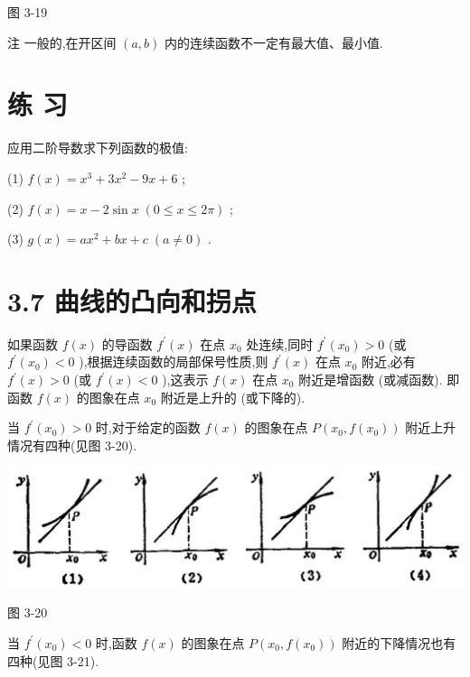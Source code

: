 \documentclass[10pt]{article}
\begin{document}
图 3-19

注 一般的,在开区间 \(\left( {a,b}\right)\) 内的连续函数不一定有最大值、最小值.

\section*{练 习}

应用二阶导数求下列函数的极值:

(1) \(f\left( x\right) = {x}^{3} + 3{x}^{2} - {9x} + 6\) ;

(2) \(f\left( x\right) = x - 2\sin x\;\left( {0 \leq x \leq {2\pi }}\right)\) ;

(3) \(g\left( x\right) = a{x}^{2} + {bx} + c\;\left( {a \neq 0}\right)\) .

\section*{3.7 曲线的凸向和拐点}

如果函数 \(f\left( x\right)\) 的导函数 \({f}^{\prime }\left( x\right)\) 在点 \({x}_{0}\) 处连续,同时 \({f}^{\prime }\left( {x}_{0}\right) > 0\) (或 \({f}^{\prime }\left( {x}_{0}\right) < 0\) ),根据连续函数的局部保号性质,则 \({f}^{\prime }\left( x\right)\) 在点 \({x}_{0}\) 附近,必有 \({f}^{\prime }\left( x\right) > 0\) (或 \({f}^{\prime }\left( x\right) < 0\) ),这表示 \(f\left( x\right)\) 在点 \({x}_{0}\) 附近是增函数 (或减函数). 即函数 \(f\left( x\right)\) 的图象在点 \({x}_{0}\) 附近是上升的 (或下降的).

当 \({f}^{\prime }\left( {x}_{0}\right) > 0\) 时,对于给定的函数 \(f\left( x\right)\) 的图象在点 \(P\left( {{x}_{0},f\left( {x}_{0}\right) }\right)\) 附近上升情况有四种(见图 3-20).

\begin{center}
\includegraphics[max width=1.0\textwidth]{images/01912c18-5c3f-733d-b775-749ba9897a9d_165_181993.jpg}
\end{center}

图 3-20

当 \({f}^{\prime }\left( {x}_{0}\right) < 0\) 时,函数 \(f\left( x\right)\) 的图象在点 \(P\left( {{x}_{0},f\left( {x}_{0}\right) }\right)\) 附近的下降情况也有四种(见图 3-21).
\end{document}
